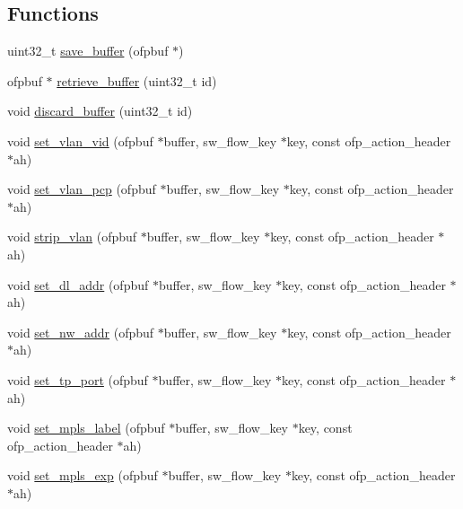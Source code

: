 \subsection*{Functions}
\begin{DoxyCompactItemize}
\item 
uint32\+\_\+t \hyperlink{openflow-interface_8h_a50f79afd1bc0ec662eadb2af5d36a985}{save\+\_\+buffer} (ofpbuf $\ast$)
\item 
ofpbuf $\ast$ \hyperlink{openflow-interface_8h_a00e216d333db54fcd04cedff5db4cf73}{retrieve\+\_\+buffer} (uint32\+\_\+t id)
\item 
void \hyperlink{openflow-interface_8h_a00cf5cac22eda1904f90e04aa68094fd}{discard\+\_\+buffer} (uint32\+\_\+t id)
\item 
void \hyperlink{openflow-interface_8h_af395e6437d75f2deccfd5d2b77d59a01}{set\+\_\+vlan\+\_\+vid} (ofpbuf $\ast$buffer, sw\+\_\+flow\+\_\+key $\ast$key, const ofp\+\_\+action\+\_\+header $\ast$ah)
\item 
void \hyperlink{openflow-interface_8h_a8ddf7121628b49e0e7c3f9d20aefcdde}{set\+\_\+vlan\+\_\+pcp} (ofpbuf $\ast$buffer, sw\+\_\+flow\+\_\+key $\ast$key, const ofp\+\_\+action\+\_\+header $\ast$ah)
\item 
void \hyperlink{openflow-interface_8h_a04fe869ce28cabd4a6c51950931b3daf}{strip\+\_\+vlan} (ofpbuf $\ast$buffer, sw\+\_\+flow\+\_\+key $\ast$key, const ofp\+\_\+action\+\_\+header $\ast$ah)
\item 
void \hyperlink{openflow-interface_8h_a4f9e907cbda9b1bd783bb2b13a92a4c7}{set\+\_\+dl\+\_\+addr} (ofpbuf $\ast$buffer, sw\+\_\+flow\+\_\+key $\ast$key, const ofp\+\_\+action\+\_\+header $\ast$ah)
\item 
void \hyperlink{openflow-interface_8h_a614ad052c670d9f60f916b897b5b2b99}{set\+\_\+nw\+\_\+addr} (ofpbuf $\ast$buffer, sw\+\_\+flow\+\_\+key $\ast$key, const ofp\+\_\+action\+\_\+header $\ast$ah)
\item 
void \hyperlink{openflow-interface_8h_acd2ac7144c62c5c2d36d5c8c7986b9da}{set\+\_\+tp\+\_\+port} (ofpbuf $\ast$buffer, sw\+\_\+flow\+\_\+key $\ast$key, const ofp\+\_\+action\+\_\+header $\ast$ah)
\item 
void \hyperlink{openflow-interface_8h_a49cf91c624a1b0aea4a830bc14624684}{set\+\_\+mpls\+\_\+label} (ofpbuf $\ast$buffer, sw\+\_\+flow\+\_\+key $\ast$key, const ofp\+\_\+action\+\_\+header $\ast$ah)
\item 
void \hyperlink{openflow-interface_8h_ad487b746e404ecfb19c4f7732c32ce6a}{set\+\_\+mpls\+\_\+exp} (ofpbuf $\ast$buffer, sw\+\_\+flow\+\_\+key $\ast$key, const ofp\+\_\+action\+\_\+header $\ast$ah)

\end{DoxyCompactItemize}

